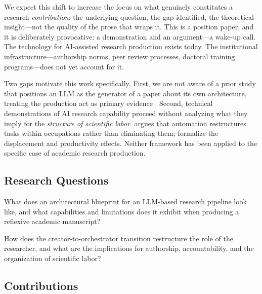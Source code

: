\documentclass{article}
\begin{document}
We expect this shift to increase the focus on what genuinely constitutes a research \textit{contribution}: the underlying question, the gap identified, the theoretical insight---not the quality of the prose that wraps it. This is a position paper, and it is deliberately provocative: a demonstration and an argument---a wake-up call. The technology for AI-assisted research production exists today. The institutional infrastructure---authorship norms, peer review processes, doctoral training programs---does not yet account for it.

Two gaps motivate this work specifically. %
First, we are not aware of a prior study that positions an LLM as the generator of a paper about its own architecture, treating the production act as primary evidence \citep[cf.][]{yamada2025scientist,ifargan2024autonomous}. Second, technical demonstrations of AI research capability proceed without analyzing what they imply for the \textit{structure of scientific labor}. \citet{autor2015why} argues that automation restructures tasks within occupations rather than eliminating them; \citet{acemoglu2018automation} formalize the displacement and productivity effects. Neither framework has been applied to the specific case of academic research production.

\subsection{Research Questions}

\begin{description}[style=nextline, leftmargin=1em]
  \item[\textbf{RQ1.}] What does an architectural blueprint for an LLM-based research pipeline look like, and what capabilities and limitations does it exhibit when producing a reflexive academic manuscript?
  \item[\textbf{RQ2.}] How does the creator-to-orchestrator transition restructure the role of the researcher, and what are the implications for authorship, accountability, and the organization of scientific labor?
\end{description}

\subsection{Contributions}
\end{document}
